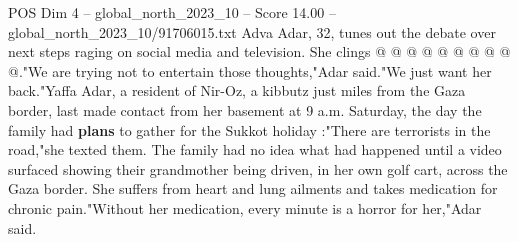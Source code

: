 \begin{textsample}{POS Dim 4 – global\_north\_2023\_10 – Score 14.00 – global\_north\_2023\_10/91706015.txt}
Adva Adar, 32, tunes out the debate over next steps raging on social media and television.
She clings @ @ @ @ @ @ @ @ @ @."We are trying not to entertain those thoughts,"Adar said."We just want her back."Yaffa Adar, a resident of Nir-Oz, a kibbutz just miles from the Gaza border, last made contact from her basement at 9 a.m.
Saturday, the day the family had \textbf{plans} to gather for the Sukkot holiday :"There are terrorists in the road,"she texted them.
The family had no idea what had happened until a video surfaced showing their grandmother being driven, in her own golf cart, across the Gaza border.
She suffers from heart and lung ailments and takes medication for chronic pain."Without her medication, every minute is a horror for her,"Adar said.

\end{textsample}
